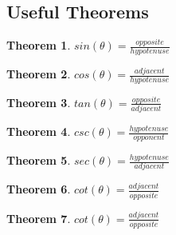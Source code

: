 \documentclass[11pt]{article}
\theoremstyle{plain}
\newtheorem{theorem}{Theorem}
\theoremstyle{definition}
\begin{document}
\subsection{Useful Theorems}
\begin{theorem}
	$sin(\theta) = \frac{opposite}{hypotenuse}$
\end{theorem}
\begin{theorem}
	$cos(\theta) = \frac{adjacent}{hypotenuse}$
\end{theorem}
\begin{theorem}
	$tan(\theta) = \frac{opposite}{adjacent}$
\end{theorem}
\begin{theorem}
	$csc(\theta) = \frac{hypotenuse}{opponent}$
\end{theorem}
\begin{theorem}
	$sec(\theta) = \frac{hypotenuse}{adjacent}$
\end{theorem}
\begin{theorem}
	$cot(\theta) = \frac{adjacent}{opposite}$
\end{theorem} 
\begin{theorem}
	$cot(\theta) = \frac{adjacent}{opposite}$
\end{theorem}
\end{document}
